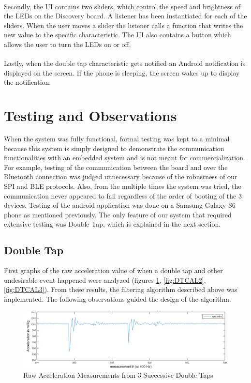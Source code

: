 \documentclass[12pt]{article}
\begin{document}
\paragraph{}
Secondly, the UI contains two sliders, which control the speed and brightness of the LEDs on the Discovery board. A listener has been instantiated for each of the sliders. When the user moves a slider the listener calls a function that writes the new value to the specific characteristic. The UI also contains a button which allows the user to turn the LEDs on or off.
\paragraph{}
Lastly, when the double tap characteristic gets notified an Android notification is displayed on the screen. If the phone is sleeping, the screen wakes up to display the notification.


\section{Testing and Observations}
When the system was fully functional, formal testing was kept to a minimal because this system is simply designed to demonstrate the communication functionalities with an embedded system and is not meant for commercialization. For example, testing of the communication between the board and over the Bluetooth connection was judged unnecessary because of the robustness of our SPI and BLE protocols. Also, from the multiple times the system was tried, the communication never appeared to fail regardless of the order of booting of the 3 devices. Testing of the android application was done on a Samsung Galaxy S6 phone as mentioned previously. The only feature of our system that required extensive testing was Double Tap, which is explained in the next section.
\subsection{Double Tap}
First graphs of the raw acceleration value of when a double tap and other undesirable event happened were analyzed (figures \ref{fig:DTCAL1}, \ref{fig:DTCAL2}, \ref{fig:DTCAL3}). From these results, the filtering algorithm described above was implemented. The following observations guided the design of the algorithm:

\begin{figure}[!htb]
 \centering
 \includegraphics[scale=0.45]{images/DTcalibration1.png}
 \caption{Raw Acceleration Measurements from 3 Successive Double Taps}
 \label{fig:DTCAL1}
\end{figure}
\end{document}
